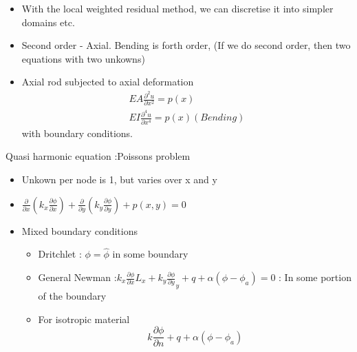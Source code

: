 	\begin{frame}
		\begin{itemize}
			\item With the local weighted residual method, we can discretise it into simpler domains etc.
			\item Second order - Axial. Bending is forth order, (If we do second order, then two equations with two unkowns)
			\item Axial rod subjected to axial deformation
			\begin{equation}
			\begin{aligned}
			EA \frac{\partial^2 u}{\partial x^2} = p(x)\\
			EI \frac{\partial^4 u}{\partial x^4} = p(x)  (Bending)			
			\end{aligned}
			\end{equation}		
			with boundary conditions. 
		\end{itemize}
	\end{frame}


	\begin{frame}{Quasi harmonic equation :Poissons problem}
		\begin{itemize}
			\item Unkown per node is 1, but varies over x and y
			\item $\frac{\partial }{\partial x} \left(k_x\frac{\partial \phi}{\partial x} \right) + \frac{\partial }{\partial y} \left(k_y\frac{\partial \phi}{\partial y} \right) + p(x,y) = 0$ 
			\item Mixed boundary conditions 
			\begin{itemize}
				\item Dritchlet : $\phi = \hat{\phi}$ in some boundary
				\item General Newman :$k_x\frac{\partial \phi}{\partial x} L_x  + k_y\frac{\partial \phi}{\partial y} _y + q + \alpha(\phi - \phi_a) = 0$ : In some portion of the boundary 		
				\item For isotropic material 
				\begin{equation}
				k \frac{\partial \phi}{\partial n} + q + \alpha(\phi - \phi_a)
				\end{equation}		
			\end{itemize}
		\end{itemize}
	\end{frame}



